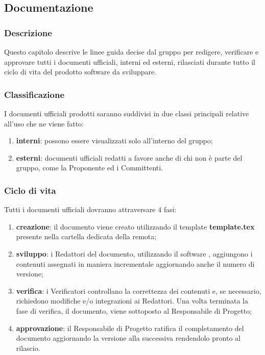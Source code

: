 \subsection{Documentazione}

	\subsubsection{Descrizione}
	Questo capitolo descrive le linee guida decise dal gruppo per redigere, verificare e approvare tutti i documenti ufficiali, interni ed esterni, rilasciati durante tutto il ciclo di vita del prodotto software da sviluppare.

	\subsubsection{Classificazione}
	I documenti ufficiali prodotti saranno suddivisi in due classi principali relative all'uso che ne viene fatto:
	\begin{enumerate}
		\item \textbf{interni}: possono essere visualizzati solo all'interno del gruppo;
		\item \textbf{esterni}: documenti ufficiali redatti a favore anche di chi non è parte del gruppo, come la Proponente ed i Committenti.
	\end{enumerate}

	\subsubsection{Ciclo di vita}
	Tutti i documenti ufficiali dovranno attraversare 4 fasi:
	\begin{enumerate}
		\item \textbf{creazione}: il documento viene creato utilizzando il template \textbf{template.tex} presente nella cartella dedicata della  remota;
		\item \textbf{sviluppo}: i Redattori del documento, utilizzando il software , aggiungono i contenuti assegnati in maniera incrementale aggiornando anche il numero di versione;
		\item \textbf{verifica}: i Verificatori controllano la correttezza dei contenuti e, se necessario, richiedono modifiche e/o integrazioni ai Redattori. Una volta terminata la fase di verifica, il documento, viene sottoposto al Responsabile di Progetto;
		\item \textbf{approvazione}: il Responsabile di Progetto ratifica il completamento del documento aggiornando la versione alla  successiva rendendolo pronto al rilascio.
	\end{enumerate}

